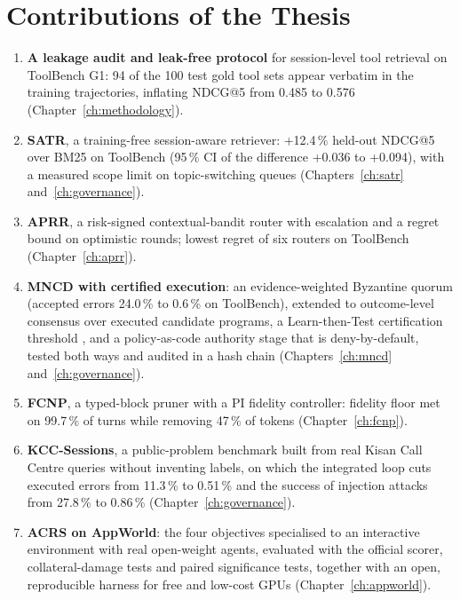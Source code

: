 \section{Contributions of the Thesis}
\label{sec:intro-contrib}

\begin{enumerate}[label=\textbf{C\arabic*}, leftmargin=*]
\item \textbf{A leakage audit and leak-free protocol} for session-level tool retrieval on ToolBench G1:
94 of the 100 test gold tool sets appear verbatim in the training trajectories, inflating NDCG@5 from
0.485 to 0.576 (Chapter~\ref{ch:methodology}).
\item \textbf{SATR}, a training-free session-aware retriever: +12.4\,\% held-out NDCG@5 over BM25 on
ToolBench (95\,\% CI of the difference +0.036 to +0.094), with a measured scope limit on topic-switching
queues (Chapters~\ref{ch:satr} and~\ref{ch:governance}).
\item \textbf{APRR}, a risk-signed contextual-bandit router with escalation and a regret bound on
optimistic rounds; lowest regret of six routers on ToolBench (Chapter~\ref{ch:aprr}).
\item \textbf{MNCD with certified execution}: an evidence-weighted Byzantine quorum (accepted errors
24.0\,\% to 0.6\,\% on ToolBench), extended to outcome-level consensus over executed candidate
programs, a Learn-then-Test certification threshold \citep{angelopoulos2025ltt}, and a policy-as-code
authority stage that is deny-by-default, tested both ways and audited in a hash chain
(Chapters~\ref{ch:mncd} and~\ref{ch:governance}).
\item \textbf{FCNP}, a typed-block pruner with a PI fidelity controller: fidelity floor met on 99.7\,\% of
turns while removing 47\,\% of tokens (Chapter~\ref{ch:fcnp}).
\item \textbf{KCC-Sessions}, a public-problem benchmark built from real Kisan Call Centre queries without
inventing labels, on which the integrated loop cuts executed errors from 11.3\,\% to 0.51\,\% and the
success of injection attacks from 27.8\,\% to 0.86\,\% (Chapter~\ref{ch:governance}).
\item \textbf{ACRS on AppWorld}: the four objectives specialised to an interactive environment with real
open-weight agents, evaluated with the official scorer, collateral-damage tests and paired significance
tests, together with an open, reproducible harness for free and low-cost GPUs
(Chapter~\ref{ch:appworld}).
\end{enumerate}

